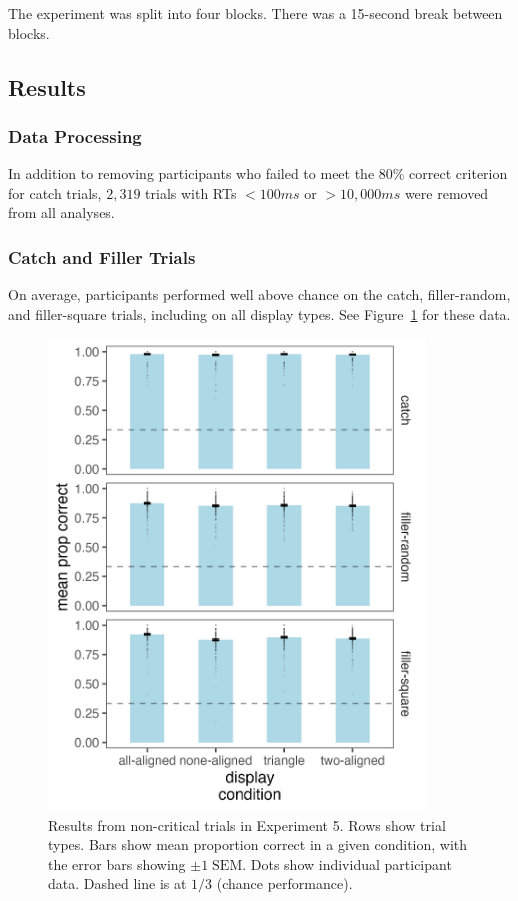 The experiment was split into four blocks. There was a 15-second break between blocks.

\subsection{Results}

\subsubsection{Data Processing}
In addition to removing participants who failed to meet the $80\%$ correct criterion for catch trials, $2,319$ trials with RTs $<100ms$ or $>10,000ms$ were removed from all analyses. 

\subsubsection{Catch and Filler Trials}
On average, participants performed well above chance on the catch, filler-random, and filler-square trials, including on all display types. See Figure~\ref{fig:comparability_non_crit_mean_prop_correct} for these data.

\begin{figure}
   \centering
   \includegraphics[width=100mm]{figures/non_crit_mean_prop_correct.jpeg}
   \caption{Results from non-critical trials in Experiment 5. Rows show trial types. Bars show mean proportion correct in a given condition, with the error bars showing $\pm1\;\text{SEM}$. Dots show individual participant data. Dashed line is at $1/3$ (chance performance).}
   \label{fig:comparability_non_crit_mean_prop_correct}
\end{figure}

